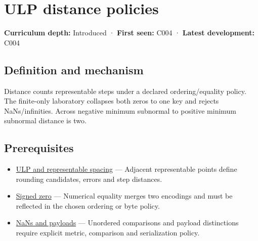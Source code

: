 \hypertarget{appendix-deca299ae4b8}{}\label{referencestart:appendix-deca299ae4b8}
\section{ULP distance policies}\label{appendix-deca299ae4b8-ulp-distance-policies}

\hypertarget{appendix-deca299ae4b8-ulp-distance-policies}{}

\textbf{Curriculum depth:} Introduced · \textbf{First seen:} C004 · \textbf{Latest development:} C004

\begin{allmightroledefinition}

\subsection{Definition and mechanism}\label{appendix-deca299ae4b8-definition-and-mechanism}

\hypertarget{appendix-deca299ae4b8-definition-and-mechanism}{}

Distance counts representable steps under a declared ordering/equality policy. The finite-only laboratory collapses both zeros to one key and rejects NaNs/infinities. Across negative minimum subnormal to positive minimum subnormal distance is two.

\end{allmightroledefinition}

\subsection{Prerequisites}\label{appendix-deca299ae4b8-prerequisites}

\hypertarget{appendix-deca299ae4b8-prerequisites}{}

\begin{itemize}
\tightlist
\item
  \hyperref[appendix-14bab4cab9d4]{ULP and representable spacing} --- Adjacent representable points define rounding candidates, errors and step distances.
\item
  \hyperref[appendix-3a048f032c1f]{Signed zero} --- Numerical equality merges two encodings and must be reflected in the chosen ordering or byte policy.
\item
  \hyperref[appendix-d6607cc4c235]{NaNs and payloads} --- Unordered comparisons and payload distinctions require explicit metric, comparison and serialization policy.
\end{itemize}

